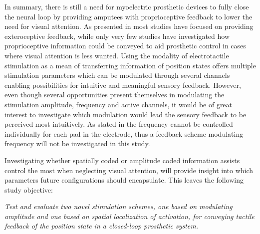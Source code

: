 

In summary, there is still a need for myoelectric prosthetic devices to fully close the neural loop by providing amputees with proprioceptive feedback to lower the need for visual attention. As presented in  most studies have focused on providing exteroceptive feedback, while only very few studies have investigated how proprioceptive information could be conveyed to aid prosthetic control in cases where visual attention is less wanted. Using the modality of electrotactile stimulation as a mean of transferring information of position states offers multiple stimulation parameters which can be modulated through several channels enabling possibilities for intuitive and meaningful sensory feedback. However, even though several opportunities present themselves in modulating the stimulation amplitude, frequency and active channels, it would be of great interest to investigate which modulation would lead the sensory feedback to be perceived most intuitively. As stated in  the frequency cannot be controlled individually for each pad in the electrode, thus a feedback scheme modulating frequency will not be investigated in this study. 

Investigating whether spatially coded or amplitude coded information assists control the most when neglecting visual attention, will provide insight into which parameters future configurations should encapsulate. This leaves the following study objective: 

\begin{center}
	\textit{Test and evaluate two novel stimulation schemes, one based on modulating amplitude and one based on spatial localization of activation, for conveying tactile feedback of the position state in a closed-loop prosthetic system.}  
\end{center} 